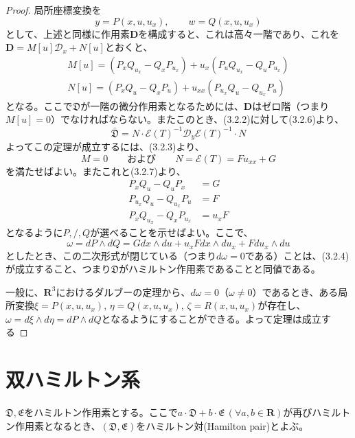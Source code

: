 \documentclass[a4paper, 11pt]{report}
\theoremstyle{definition}
\begin{document}
\begin{proof}
 局所座標変換を
\begin{equation*}
y = P(x,u,u_x), \qquad w = Q(x,u,u_x)
\end{equation*}
 として、上述と同様に作用素$\mathbf{D}$を構成すると、これは高々一階であり、これを$\mathbf{D}=M[u]\mathcal{D}_x+N[u]$とおくと、
\begin{align}
M[u] = (P_xQ_{u_x}-Q_xP_{u_x})+u_x(P_uQ_{u_x}-Q_uP_{u_x})\nonumber\\
N[u] = (P_xQ_u-Q_xP_u)+u_{xx}(P_{u_x}Q_u-Q_{u_x}P_u)  %
\end{align}
となる。ここで$\mathfrak{D}$が一階の微分作用素となるためには、$\mathbf{D}$はゼロ階（つまり$M[u]=0$）でなければならない。またこのとき、(3.2.2)に対して(3.2.6)より、
\begin{equation*}
\bar{\mathfrak{D}} = N\cdot \mathcal{E}(T)^{-1}\mathcal{D}_y\mathcal{E}(T)^{-1}\cdot N
\end{equation*}
よってこの定理が成立するには、(3.2.3)より、
\begin{equation}
M=0 \qquad \text{および} \qquad N=\mathcal{E}(T)=Fu_{xx}+G  %
\end{equation}
を満たせばよい。またこれと(3.2.7)より、
\begin{align}
P_xQ_u-Q_uP_x &= G\nonumber\\
P_{u_x}Q_u-Q_{u_x}P_u &= F\nonumber\\
P_xQ_{u_x}-Q_xP_{u_x} &= u_xF
\end{align}
となるように$P, /, Q$が選べることを示せばよい。ここで、
\begin{equation*}
\omega = dP\wedge dQ = Gdx\wedge du + u_xFdx\wedge du_x + Fdu_x\wedge du
\end{equation*}
としたとき、この二次形式が閉じている（つまり$d\omega =0$である）ことは、(3.2.4)が成立すること、つまり$\mathfrak{D}$がハミルトン作用素であることと同値である。

 一般に、$\mathbf{R}^3$におけるダルブーの定理から、$d\omega =0$（$\omega\ne 0$）であるとき、ある局所変換$\xi =P(x,u,u_x), \, \eta =Q(x,u,u_x), \, \zeta =R(x,u,u_x)$が存在し、$\omega = d\xi\wedge d\eta=dP\wedge dQ$となるようにすることができる。よって定理は成立する
\end{proof}

\section{双ハミルトン系}

 $\mathfrak{D},\mathfrak{E}$をハミルトン作用素とする。ここで$a\cdot\mathfrak{D}+b\cdot\mathfrak{E} \, (\forall a,b\in\mathbf{R})$が再びハミルトン作用素となるとき、$(\mathfrak{D},\mathfrak{E})$をハミルトン対(Hamilton pair)とよぶ。
\end{document}
